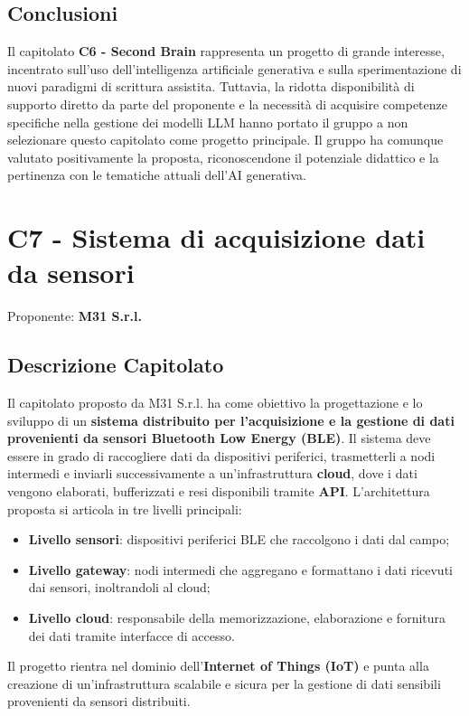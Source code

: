 \documentclass[a4paper,12pt]{article}
\begin{document}
{{{    \subsection{Conclusioni}
        Il capitolato \textbf{C6 - Second Brain} rappresenta un progetto di grande interesse, incentrato sull’uso dell’intelligenza artificiale generativa e sulla sperimentazione di nuovi paradigmi di scrittura assistita.
        Tuttavia, la ridotta disponibilità di supporto diretto da parte del proponente e la necessità di acquisire competenze specifiche nella gestione dei modelli LLM hanno portato il gruppo a non selezionare questo capitolato come progetto principale.
        Il gruppo ha comunque valutato positivamente la proposta, riconoscendone il potenziale didattico e la pertinenza con le tematiche attuali dell’AI generativa.
    


\newpage

\section{C7 - Sistema di acquisizione dati da sensori}
    Proponente: \textbf{M31 S.r.l.}

    \subsection{Descrizione Capitolato}
        Il capitolato proposto da M31 S.r.l. ha come obiettivo la progettazione e lo sviluppo di un \textbf{sistema distribuito per l’acquisizione e la gestione di dati provenienti da sensori Bluetooth Low Energy (BLE)}.
        Il sistema deve essere in grado di raccogliere dati da dispositivi periferici, trasmetterli a nodi intermedi e inviarli successivamente a un’infrastruttura \textbf{cloud}, dove i dati vengono elaborati, bufferizzati e resi disponibili tramite \textbf{API}.
        L’architettura proposta si articola in tre livelli principali:
        \begin{itemize}
            \item \textbf{Livello sensori}: dispositivi periferici BLE che raccolgono i dati dal campo;
            \item \textbf{Livello gateway}: nodi intermedi che aggregano e formattano i dati ricevuti dai sensori, inoltrandoli al cloud;
            \item \textbf{Livello cloud}: responsabile della memorizzazione, elaborazione e fornitura dei dati tramite interfacce di accesso.
        \end{itemize}
        Il progetto rientra nel dominio dell’\textbf{Internet of Things (IoT)} e punta alla creazione di un’infrastruttura scalabile e sicura per la gestione di dati sensibili provenienti da sensori distribuiti.
    

}}}
\end{document}
